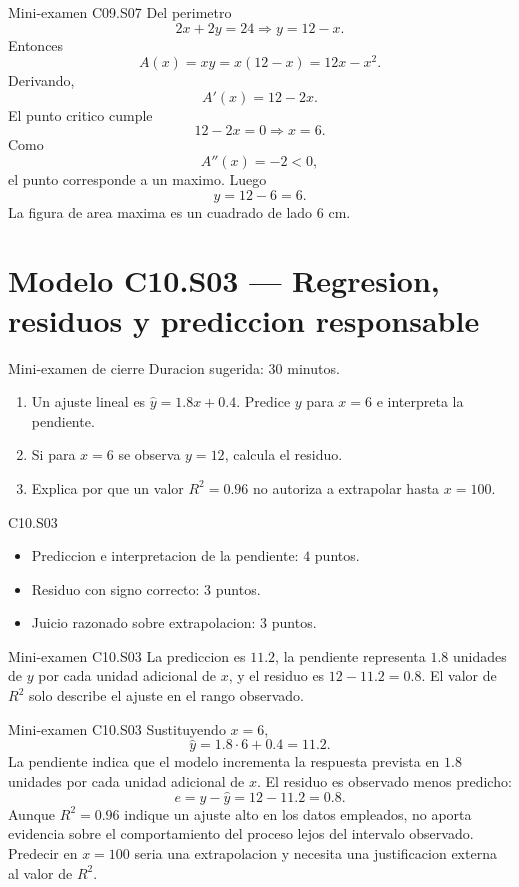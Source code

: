 \begin{fullsolution}{Mini-examen C09.S07}
Del perimetro
\[
2x+2y=24
\Longrightarrow
y=12-x.
\]
Entonces
\[
A(x)=xy=x(12-x)=12x-x^2.
\]
Derivando,
\[
A'(x)=12-2x.
\]
El punto critico cumple
\[
12-2x=0 \Longrightarrow x=6.
\]
Como
\[
A''(x)=-2<0,
\]
el punto corresponde a un maximo. Luego
\[
y=12-6=6.
\]
La figura de area maxima es un cuadrado de lado \(6\) cm.
\end{fullsolution}

\section{Modelo C10.S03 --- Regresion, residuos y prediccion responsable}

\begin{exambrief}{Mini-examen de cierre}
Duracion sugerida: \(30\) minutos.
\begin{enumerate}
  \item Un ajuste lineal es \(\hat y=1.8x+0.4\). Predice \(y\) para \(x=6\) e interpreta la
  pendiente.
  \item Si para \(x=6\) se observa \(y=12\), calcula el residuo.
  \item Explica por que un valor \(R^2=0.96\) no autoriza a extrapolar hasta \(x=100\).
\end{enumerate}
\end{exambrief}

\begin{rubricbox}{C10.S03}
\begin{itemize}
  \item Prediccion e interpretacion de la pendiente: \(4\) puntos.
  \item Residuo con signo correcto: \(3\) puntos.
  \item Juicio razonado sobre extrapolacion: \(3\) puntos.
\end{itemize}
\end{rubricbox}

\begin{shortanswer}{Mini-examen C10.S03}
La prediccion es \(11.2\), la pendiente representa \(1.8\) unidades de \(y\) por cada unidad
adicional de \(x\), y el residuo es \(12-11.2=0.8\). El valor de \(R^2\) solo describe el ajuste
en el rango observado.
\end{shortanswer}

\begin{fullsolution}{Mini-examen C10.S03}
Sustituyendo \(x=6\),
\[
\hat y=1.8\cdot6+0.4=11.2.
\]
La pendiente indica que el modelo incrementa la respuesta prevista en \(1.8\) unidades por cada
unidad adicional de \(x\). El residuo es observado menos predicho:
\[
e=y-\hat y=12-11.2=0.8.
\]
Aunque \(R^2=0.96\) indique un ajuste alto en los datos empleados, no aporta evidencia sobre el
comportamiento del proceso lejos del intervalo observado. Predecir en \(x=100\) seria una
extrapolacion y necesita una justificacion externa al valor de \(R^2\).
\end{fullsolution}

